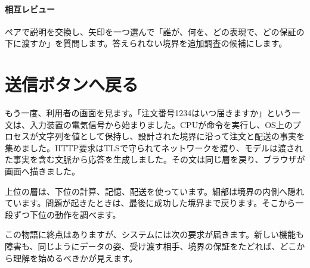 \paragraph{相互レビュー}
    ペアで説明を交換し、矢印を一つ選んで「誰が、何を、どの表現で、どの保証の下に渡すか」を質問します。答えられない境界を追加調査の候補にします。

\par
\endgroup


\section{送信ボタンへ戻る}
\label{sec:07-practice-19}

もう一度、利用者の画面を見ます。「注文番号1234はいつ届きますか」という一文は、入力装置の電気信号から始まりました。CPUが命令を実行し、OS上のプロセスが文字列を値として保持し、設計された境界に沿って注文と配送の事実を集めました。HTTP要求はTLSで守られてネットワークを渡り、モデルは渡された事実を含む文脈から応答を生成しました。その文は同じ層を戻り、ブラウザが画面へ描きました。

上位の層は、下位の計算、記憶、配送を使っています。細部は境界の内側へ隠れています。問題が起きたときは、最後に成功した境界まで戻ります。そこから一段ずつ下位の動作を調べます。

この物語に終点はありますが、システムには次の要求が届きます。新しい機能も障害も、同じようにデータの姿、受け渡す相手、境界の保証をたどれば、どこから理解を始めるべきかが見えます。



